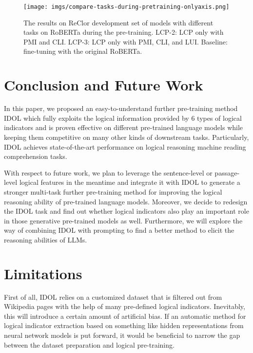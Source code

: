\documentclass[11pt]{article}
\begin{document}
\begin{figure}
\centering
\texttt{[image: imgs/compare-tasks-during-pretraining-onlyaxis.png]}
\caption{The results on ReClor development set of models with different tasks on RoBERTa during the pre-training. LCP-2: LCP only with PMI and CLI. LCP-3: LCP only with PMI, CLI, and LUI. Baseline: fine-tuning with the original RoBERTa.}
\label{fig:diffpretasks}
\end{figure}





\section{Conclusion and Future Work}



In this paper, we proposed an easy-to-understand further pre-training method IDOL which fully exploits the logical information provided by 6 types of logical indicators and is proven effective on different pre-trained language models while keeping them competitive on many other kinds of downstream tasks. Particularly, IDOL achieves state-of-the-art performance on logical reasoning machine reading comprehension tasks.

With respect to future work, we plan to leverage the sentence-level or passage-level logical features in the meantime and integrate it with IDOL to generate a stronger multi-task further pre-training method for improving the logical reasoning ability of pre-trained language models. Moreover, we decide to redesign the IDOL task and find out whether logical indicators also play an important role in those generative pre-trained models as well. Furthermore, we will explore the way of combining IDOL with prompting to find a better method to elicit the reasoning abilities of LLMs.




\section{Limitations}

First of all, IDOL relies on a customized dataset that is filtered out from Wikipedia pages with the help of many pre-defined logical indicators. Inevitably, this will introduce a certain amount of artificial bias. If an automatic method for logical indicator extraction based on something like hidden representations from neural network models is put forward, it would be beneficial to narrow the gap between the dataset preparation and logical pre-training. 
\end{document}
